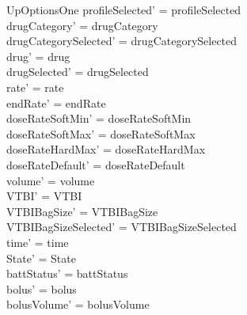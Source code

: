 \begin{schema}{UpOptionsOne}
	profileSelected' = profileSelected\\
	drugCategory' = drugCategory\\ 
	drugCategorySelected' = drugCategorySelected\\
	drug' = drug\\ 
	drugSelected' = drugSelected\\
	rate' = rate\\
	\pagebreak
	endRate' = endRate\\
	doseRateSoftMin' = doseRateSoftMin\\
	doseRateSoftMax' = doseRateSoftMax\\
	doseRateHardMax' = doseRateHardMax\\
	doseRateDefault' = doseRateDefault\\
	volume' = volume\\
	VTBI' = VTBI\\
	VTBIBagSize' = VTBIBagSize\\ VTBIBagSizeSelected' = VTBIBagSizeSelected\\
	time' = time\\ State' = State\\
	battStatus' = battStatus\\
	bolus' = bolus\\
	bolusVolume' = bolusVolume\\

\end{schema}

